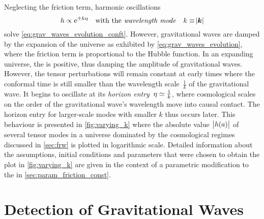 
Neglecting the friction term, harmonic oscillations
\begin{equation}
	h \propto \mathrm{e}^{\pm k \eta} \quad \text{with the \emph{wavelength mode}} \quad k \equiv \abs{\boldsymbol{k}}
\end{equation}
solve \eqref{eq:grav_waves_evolution_conft}. However, gravitational waves are damped by the expansion of the universe as exhibited by \eqref{eq:grav_waves_evolution}, where the friction term is proportional to the Hubble function. In an expanding universe, the  is positive, thus damping the amplitude of gravitational waves. However, the tensor perturbations will remain constant at early times where the conformal time is still smaller than the wavelength scale~\(\frac{1}{k}\) of the gravitational wave. It begins to oscillate at its \emph{horizon entry}~\(\eta \simeq \frac{1}{k}\), where cosmological scales on the order of the gravitational wave's wavelength move into causal contact. The horizon entry for larger-scale modes with smaller \(k\) thus occurs later. This behaviour is presented in \autoref{fig:varying_k} where the absolute value~\(\abs{h(a)}\) of several tensor modes in a universe dominated by the cosmological regimes discussed in \autoref{sec:frw} is plotted in logarithmic scale. Detailed information about the assumptions, initial conditions and parameters that were chosen to obtain the plot in \autoref{fig:varying_k} are given in the context of a parametric modification to the  in \autoref{sec:param_friction_const}.


\section{Detection of Gravitational Waves}\label{sec:grav_waves_detection}

